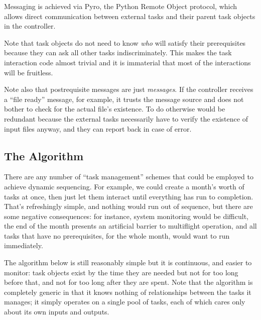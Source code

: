 \documentclass[12pt]{article}
\begin{document}
Messaging is achieved via Pyro, the Python Remote Object protocol, which
allows direct communication between external tasks and their parent task
objects in the controller. 

Note that task objects do not need to know {\em who} will satisfy their
prerequisites because they can ask all other tasks indiscriminately.
This makes the task interaction code almost trivial and it is immaterial
that most of the interactions will be fruitless. 

Note also that postrequisite messages are just {\em messages}. If the
controller receives a ``file ready'' message, for example, it trusts the
message source and does not bother to check for the actual file's
existence. To do otherwise would be redundant because the external tasks
necessarily have to verify the existence of input files anyway, and they
can report back in case of error.


\subsection{The Algorithm}

There are any number of ``task management'' schemes that could be
employed to achieve dynamic sequencing. For example, we could create a
month's worth of tasks at once, then just let them interact until
everything has run to completion.  That's refreshingly simple, and
nothing would run out of sequence, but there are some negative
consequences: for instance, system monitoring would be difficult, the
end of the month presents an artificial barrier to multiflight
operation, and all tasks that have no prerequisites, for the whole
month, would want to run immediately.

The algorithm below is still reasonably simple but it is continuous, and
easier to monitor: task objects exist by the time they are needed but
not for too long before that, and not for too long after they are spent.
Note that the algorithm is completely generic in that it knows nothing
of relationships between the tasks it manages; it simply operates on a
single pool of tasks, each of which cares only about its own inputs and
outputs.  
\end{document}
